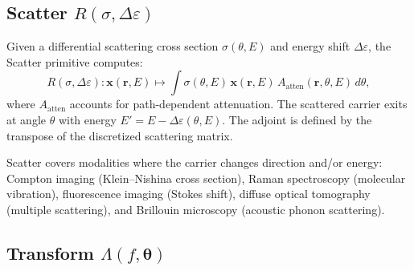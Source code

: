\documentclass[11pt]{article}
\begin{document}
\subsection{Scatter \texorpdfstring{$R(\sigma, \Delta\varepsilon)$}{R(sigma, Delta epsilon)}}

\begin{definition}[Scatter]
\label{def:scatter}
Given a differential scattering cross section $\sigma(\theta, E)$ and energy shift $\Delta\varepsilon$, the Scatter primitive computes:
\begin{equation}
  R(\sigma, \Delta\varepsilon): \mathbf{x}(\mathbf{r}, E) \mapsto \int \sigma(\theta, E)\, \mathbf{x}(\mathbf{r}, E)\, A_{\mathrm{atten}}(\mathbf{r}, \theta, E)\, d\theta,
\end{equation}
where $A_{\mathrm{atten}}$ accounts for path-dependent attenuation. The scattered carrier exits at angle $\theta$ with energy $E' = E - \Delta\varepsilon(\theta, E)$. The adjoint is defined by the transpose of the discretized scattering matrix.
\end{definition}

\begin{remark}
Scatter covers modalities where the carrier changes direction and/or energy: Compton imaging (Klein--Nishina cross section), Raman spectroscopy (molecular vibration), fluorescence imaging (Stokes shift), diffuse optical tomography (multiple scattering), and Brillouin microscopy (acoustic phonon scattering).
\end{remark}

\subsection{Transform \texorpdfstring{$\Lambda(f, \boldsymbol{\theta})$}{Lambda(f, theta)}}
\end{document}
